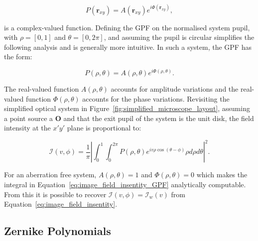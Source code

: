 \begin{equation}\label{eq:GPF}
P\left(\textbf{r}_{xy}\right) = A\left(\textbf{r}_{xy}\right)e^{i\Phi\left(\textbf{r}_{xy}\right)},
\end{equation}

is a complex-valued function. Defining the GPF on the normalised system 
pupil, with $\rho = [0,1]$ and $\theta = [0,2\pi]$, and assuming the pupil is circular simplifies the following analysis
and is generally more intuitive. In such a system, the GPF has the form:

\begin{equation}\label{eq:GPF_polar}
P\left(\rho,\theta\right) = A\left(\rho,\theta\right)e^{i\Phi\left(\rho,\theta\right)}.
\end{equation}

The real-valued function $A\left(\rho,\theta\right)$ accounts for amplitude
variations and the real-valued function $\Phi\left(\rho,\theta\right)$ 
accounts for the phase variations. Revisiting the simplified optical
system in Figure~\ref{fig:simplified_microscope_layout}, assuming a point
source a $\textbf{O}$ and that the exit pupil of the system is the unit 
disk, the field intensity at the $x'y'$ plane is proportional 
to\cite{goodman2005introduction,born2013principles}:

\begin{equation}\label{eq:image_field_insentity_GPF}
\mathcal{I}(v,\phi) = \frac{1}{\pi}\left|\int^{1}_{0}\int^{2\pi}_{0}P\left(\rho,\theta\right)e^{iv\rho\cos(\theta-\phi)}\rho d\rho d\theta\right|^{2}.
\end{equation}

For an aberration free system, $A\left(\rho,\theta\right) = 1$ and 
$\Phi\left(\rho,\theta\right) = 0$ which makes the integral in 
Equation~\ref{eq:image_field_insentity_GPF} analytically computable. From 
this it is possible to recover $\mathcal{I}(v,\phi) = \mathcal{I}_{w}(v)$
from Equation~\ref{eq:image_field_insentity}.

\subsection{Zernike Polynomials}
\label{subsec:zernike}

